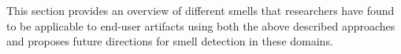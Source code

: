 \documentclass[10pt,conference,compsocconf]{IEEEtran}
\begin{document}
This section provides an overview of different smells that researchers have found to be applicable to end-user artifacts using both the above described approaches and proposes future directions for smell detection in these domains. 


%
%
\end{document}
